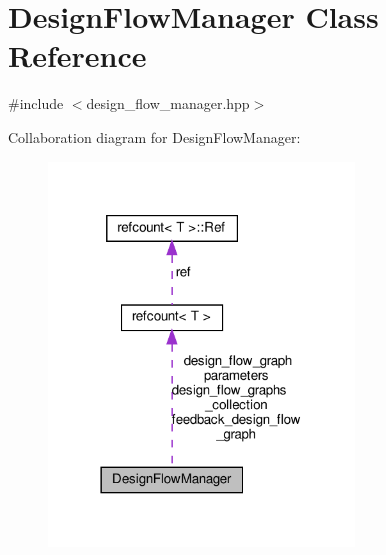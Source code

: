 \hypertarget{classDesignFlowManager}{}\section{Design\+Flow\+Manager Class Reference}
\label{classDesignFlowManager}


{\ttfamily \#include $<$design\+\_\+flow\+\_\+manager.\+hpp$>$}



Collaboration diagram for Design\+Flow\+Manager\+:
\nopagebreak
\begin{figure}[H]
\begin{center}
\leavevmode
\includegraphics[width=230pt]{dc/de6/classDesignFlowManager__coll__graph}
\end{center}
\end{figure}
